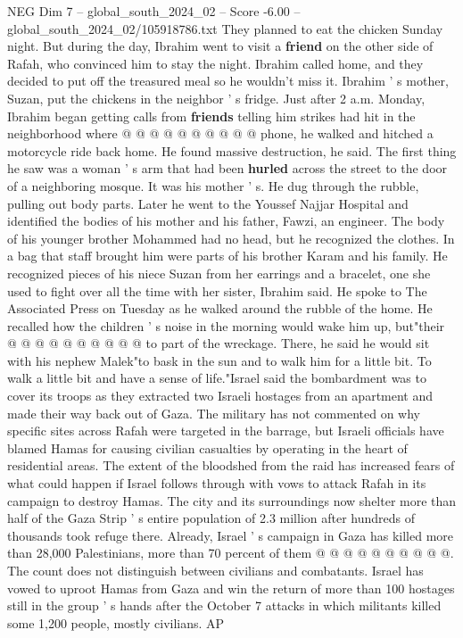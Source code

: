 \begin{textsample}{NEG Dim 7 – global\_south\_2024\_02 – Score -6.00 – global\_south\_2024\_02/105918786.txt}
They planned to eat the chicken Sunday night.
But during the day, Ibrahim went to visit a \textbf{friend} on the other side of Rafah, who convinced him to stay the night.
Ibrahim called home, and they decided to put off the treasured meal so he wouldn't miss it.
Ibrahim ' s mother, Suzan, put the chickens in the neighbor ' s fridge.
Just after 2 a.m.
Monday, Ibrahim began getting calls from \textbf{friends} telling him strikes had hit in the neighborhood where @ @ @ @ @ @ @ @ @ @ phone, he walked and hitched a motorcycle ride back home.
He found massive destruction, he said.
The first thing he saw was a woman ' s arm that had been \textbf{hurled} across the street to the door of a neighboring mosque.
It was his mother ' s.
He dug through the rubble, pulling out body parts.
Later he went to the Youssef Najjar Hospital and identified the bodies of his mother and his father, Fawzi, an engineer.
The body of his younger brother Mohammed had no head, but he recognized the clothes.
In a bag that staff brought him were parts of his brother Karam and his family.
He recognized pieces of his niece Suzan from her earrings and a bracelet, one she used to fight over all the time with her sister, Ibrahim said.
He spoke to The Associated Press on Tuesday as he walked around the rubble of the home.
He recalled how the children ' s noise in the morning would wake him up, but"their @ @ @ @ @ @ @ @ @ @ to part of the wreckage.
There, he said he would sit with his nephew Malek"to bask in the sun and to walk him for a little bit.
To walk a little bit and have a sense of life."Israel said the bombardment was to cover its troops as they extracted two Israeli hostages from an apartment and made their way back out of Gaza.
The military has not commented on why specific sites across Rafah were targeted in the barrage, but Israeli officials have blamed Hamas for causing civilian casualties by operating in the heart of residential areas.
The extent of the bloodshed from the raid has increased fears of what could happen if Israel follows through with vows to attack Rafah in its campaign to destroy Hamas.
The city and its surroundings now shelter more than half of the Gaza Strip ' s entire population of 2.3 million after hundreds of thousands took refuge there.
Already, Israel ' s campaign in Gaza has killed more than 28,000 Palestinians, more than 70 percent of them @ @ @ @ @ @ @ @ @ @.
The count does not distinguish between civilians and combatants.
Israel has vowed to uproot Hamas from Gaza and win the return of more than 100 hostages still in the group ' s hands after the October 7 attacks in which militants killed some 1,200 people, mostly civilians.
AP

\end{textsample}

